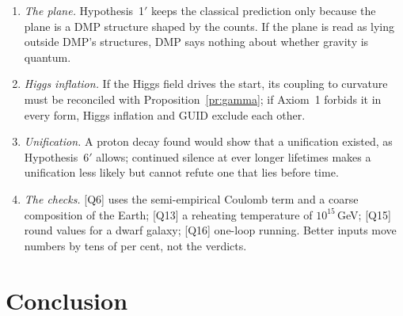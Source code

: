 \documentclass[11pt,a4paper]{article}
\theoremstyle{definition}
\theoremstyle{remark}
\newcommand{\chk}[1]{\textsf{[#1]}}
\newcommand{\nw}[1]{{\color{newc}#1}}
\newcommand{\vtag}{{\color{newc}\textsf{\scriptsize[v5.1]}}}
\theoremstyle{definition}
\begin{document}
\begin{enumerate}[nosep]
3+1 manifold in any limit.
\item \nw{\vtag{} \emph{The plane.} Hypothesis~1$'$ keeps the classical prediction only because the plane is a DMP structure shaped by
the counts. If the plane is read as lying outside DMP's structures, DMP says nothing about whether gravity is quantum.}
\item \nw{\vtag{} \emph{Higgs inflation.} If the Higgs field drives the start, its coupling to curvature must be reconciled with
Proposition~\ref{pr:gamma}; if Axiom~1 forbids it in every form, Higgs inflation and GUID exclude each other.}
\item \nw{\vtag{} \emph{Unification.} A proton decay found would show that a unification existed, as Hypothesis~6$'$ allows; continued
silence at ever longer lifetimes makes a unification less likely but cannot refute one that lies before time.}
\item \emph{The checks.} \chk{Q6} uses the semi-empirical Coulomb term and a coarse composition of the Earth; \chk{Q13} a reheating
temperature of $10^{15}$\,GeV; \chk{Q15} round values for a dwarf galaxy; \chk{Q16} one-loop running. Better inputs move numbers by tens of
per cent, not the verdicts.
\end{enumerate}

\section{Conclusion}
\end{document}
